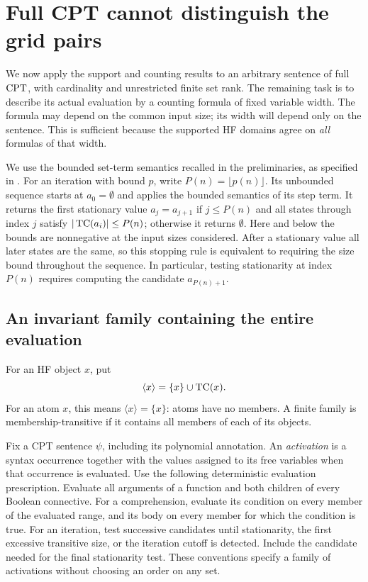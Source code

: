 \section{Full CPT cannot distinguish the grid pairs}
\label{eval:section}
\label{sec:cpt-lower-bound}

We now apply the support and counting results to an arbitrary sentence of
full \(\mathrm{CPT}\), with cardinality and unrestricted finite set rank.  The
remaining task is to describe its actual evaluation by a counting formula
of fixed variable width.  The formula may depend on the common input size;
its width will depend only on the sentence.  This is sufficient because
the supported HF domains agree on \emph{all} formulas of that width.

We use the bounded set-term semantics recalled in the preliminaries,
as specified in \cite[Section~2]{ls2023}.
For an iteration with bound \(p\), write
\(P(n)=\lfloor p(n)\rfloor\).  Its unbounded sequence starts at
\(a_0=\emptyset\) and applies the bounded semantics of its step term.
It returns the first stationary value \(a_j=a_{j+1}\) if
\(j\le P(n)\) and all states through index \(j\) satisfy
\(|\operatorname{TC}(a_i)|\le P(n)\); otherwise it returns \(\emptyset\).
Here and below the bounds are nonnegative at the input sizes considered.
After a stationary value all later states are the same, so this stopping
rule is equivalent to requiring the size bound throughout the sequence.
In particular, testing stationarity at index \(P(n)\) requires computing
the candidate \(a_{P(n)+1}\).

\subsection{An invariant family containing the entire evaluation}

For an HF object \(x\), put
\[
 \langle x\rangle=\{x\}\cup\operatorname{TC}(x).
\]
For an atom \(x\), this means \(\langle x\rangle=\{x\}\): atoms have no
members.  A finite family is membership-transitive if it contains all
members of each of its objects.

Fix a CPT sentence \(\psi\), including its polynomial annotation.
An \emph{activation} is a syntax occurrence together with the values
assigned to its free variables when that occurrence is evaluated.
Use the following deterministic evaluation prescription.  Evaluate all
arguments of a function and both children of every Boolean connective.
For a comprehension, evaluate its condition on every member of the
evaluated range, and its body on every member for which the condition is
true.  For an iteration, test successive candidates until stationarity,
the first excessive transitive size, or the iteration cutoff is
detected.  Include the candidate needed for the final stationarity test.
These conventions specify a family of activations without choosing an
order on any set.

